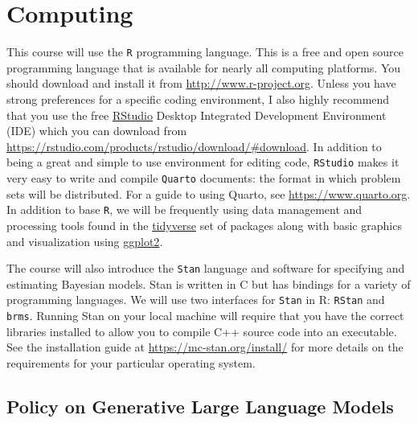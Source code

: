 \documentclass[11pt, article, oneside]{memoir}
\theoremstyle{Assumption}
\begin{document}
\section*{Computing}

This course will use the \texttt{R} programming language. This is a free and open source programming language that is available for nearly all computing platforms. You should download and install it from \url{http://www.r-project.org}. Unless you have strong preferences for a specific coding environment, I also highly recommend that you use the free \href{https://rstudio.com}{RStudio} Desktop Integrated Development Environment (IDE) which you can download from \url{https://rstudio.com/products/rstudio/download/#download}. In addition to being a great and simple to use environment for editing code, \texttt{RStudio} makes it very easy to write and compile \texttt{Quarto} documents: the format in which problem sets will be distributed. For a guide to using Quarto, see \url{https://www.quarto.org}. In addition to base \texttt{R}, we will be frequently using data management and processing tools found in the \href{https://www.tidyverse.org/}{tidyverse} set of packages along with basic graphics and visualization using \href{https://ggplot2.tidyverse.org/}{ggplot2}. 

The course will also introduce the \texttt{Stan} language and software for specifying and estimating Bayesian models. Stan is written in C but has bindings for a variety of programming languages. We will use two interfaces for \texttt{Stan} in R: \texttt{RStan} and \texttt{brms}. Running Stan on your local machine will require that you have the correct libraries installed to allow you to compile C++ source code into an executable. See the installation guide at \url{https://mc-stan.org/install/} for more details on the requirements for your particular operating system.

\subsection*{Policy on Generative Large Language Models}
\end{document}
